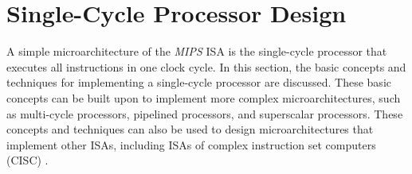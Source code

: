 








\section{Single-Cycle Processor Design}
\label{sec:SingleCycleProcessorDesign}

A simple microarchitecture of the {\it MIPS} ISA is the single-cycle processor that executes all instructions in one clock cycle. In this section, the basic concepts and techniques for implementing a single-cycle processor are discussed. These basic concepts can be built upon to implement more complex microarchitectures, such as multi-cycle processors, pipelined processors, and superscalar processors. These concepts and techniques can also be used to design microarchitectures that implement other ISAs, including ISAs of complex instruction set computers (CISC) \cite{Patterson2005}. \\

